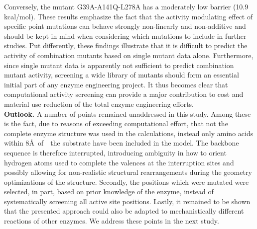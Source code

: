 Conversely, the mutant G39A-A141Q-L278A has a moderately low barrier (10.9 kcal/mol).
These results emphasize the fact that the activity modulating effect of specific point mutations can behave strongly non-linearly and non-additive and should be kept in mind when considering which mutations to include in further studies.
Put differently, these findings illustrate that it is difficult to predict the activity of combination mutants based on single mutant data alone.
Furthermore, since single mutant data is apparently not sufficient to predict combination mutant activity, screening a wide library of mutants should form an essential initial part of any enzyme engineering project.
It thus becomes clear that computational activity screening can provide a major contribution to cost and material use reduction of the total enzyme engineering efforts.\\
\textbf{Outlook.} A number of points remained unaddressed in this study.
Among these is the fact, due to reasons of exceeding computational effort, that not the complete enzyme structure was used in the calculations, instead only amino acids within 8\AA \mbox{ of } the substrate have been included in the model.
The backbone sequence is therefore interrupted, introducing ambiguity in how to orient hydrogen atoms used to complete the valences at the interruption sites and possibly allowing for non-realistic structural rearrangements during the geometry optimizations of the structure.
Secondly, the positions which were mutated were selected, in part, based on prior knowledge of the enzyme, instead of systematically screening all active site positions.
Lastly, it remained to be shown that the presented approach could also be adapted to mechanistically different reactions of other enzymes.
We address these points in the next study.
%

